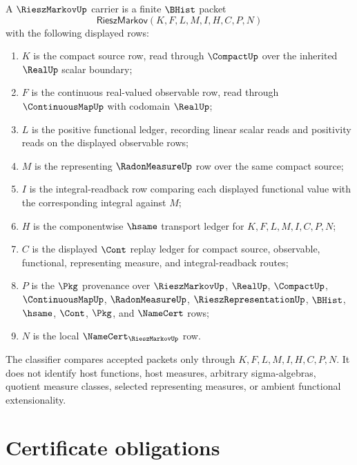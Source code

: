 \begin{definition}
\label{def:riesz-markov-compact-positive-functional-carrier}
A $\RieszMarkovUp$ carrier is a finite $\BHist$ packet
$$
\mathsf{RieszMarkov}(K,F,L,M,I,H,C,P,N)
$$
with the following displayed rows:
\begin{enumerate}
  \item $K$ is the compact source row, read through $\CompactUp$ over the inherited $\RealUp$ scalar boundary;
  \item $F$ is the continuous real-valued observable row, read through $\ContinuousMapUp$ with codomain $\RealUp$;
  \item $L$ is the positive functional ledger, recording linear scalar reads and positivity reads on the displayed observable rows;
  \item $M$ is the representing $\RadonMeasureUp$ row over the same compact source;
  \item $I$ is the integral-readback row comparing each displayed functional value with the corresponding integral against $M$;
  \item $H$ is the componentwise $\hsame$ transport ledger for $K,F,L,M,I,C,P,N$;
  \item $C$ is the displayed $\Cont$ replay ledger for compact source, observable, functional, representing measure, and integral-readback routes;
  \item $P$ is the $\Pkg$ provenance over $\RieszMarkovUp$, $\RealUp$, $\CompactUp$, $\ContinuousMapUp$, $\RadonMeasureUp$, $\RieszRepresentationUp$, $\BHist$, $\hsame$, $\Cont$, $\Pkg$, and $\NameCert$ rows;
  \item $N$ is the local $\NameCert_{\RieszMarkovUp}$ row.
\end{enumerate}
The classifier compares accepted packets only through $K,F,L,M,I,H,C,P,N$. It does not identify host functions, host measures, arbitrary sigma-algebras, quotient measure classes, selected representing measures, or ambient functional extensionality.
\end{definition}

\section{Certificate obligations}
\label{sec:riesz-markov-namecert-obligations}

